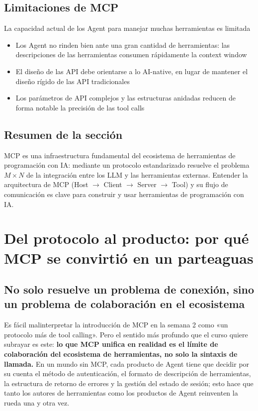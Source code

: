 \documentclass[a4paper]{article}
\begin{document}
\subsection{Limitaciones de MCP}

\begin{warningbox}{La capacidad actual de los Agent para manejar muchas herramientas es limitada}
\begin{itemize}
    \item Los Agent no rinden bien ante una gran cantidad de herramientas: las descripciones de las herramientas consumen rápidamente la context window
    \item El diseño de las API debe orientarse a lo AI-native, en lugar de mantener el diseño rígido de las API tradicionales
    \item Los parámetros de API complejos y las estructuras anidadas reducen de forma notable la precisión de las tool calls
\end{itemize}
\end{warningbox}

\subsection{Resumen de la sección}

MCP es una infraestructura fundamental del ecosistema de herramientas de programación con IA: mediante un protocolo estandarizado resuelve el problema $M \times N$ de la integración entre los LLM y las herramientas externas. Entender la arquitectura de MCP (Host $\rightarrow$ Client $\rightarrow$ Server $\rightarrow$ Tool) y su flujo de comunicación es clave para construir y usar herramientas de programación con IA.
\section{Del protocolo al producto: por qué MCP se convirtió en un parteaguas}

\subsection{No solo resuelve un problema de conexión, sino un problema de colaboración en el ecosistema}
Es fácil malinterpretar la introducción de MCP en la semana 2 como «un protocolo más de tool calling». Pero el sentido más profundo que el curso quiere subrayar es este: \textbf{lo que MCP unifica en realidad es el límite de colaboración del ecosistema de herramientas, no solo la sintaxis de llamada.} En un mundo sin MCP, cada producto de Agent tiene que decidir por su cuenta el método de autenticación, el formato de descripción de herramientas, la estructura de retorno de errores y la gestión del estado de sesión; esto hace que tanto los autores de herramientas como los productos de Agent reinventen la rueda una y otra vez.
\end{document}
